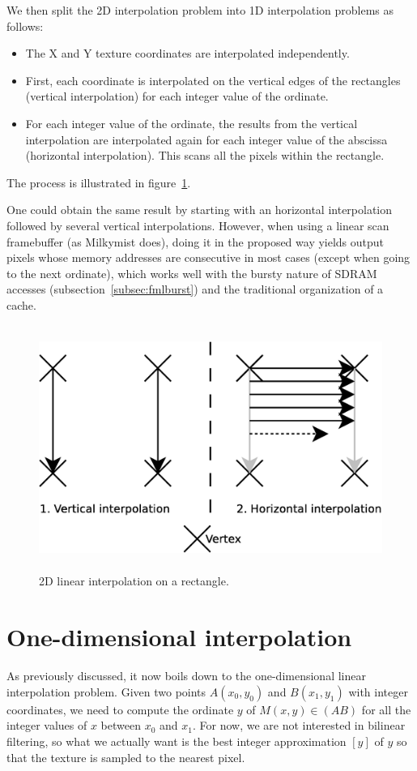 \documentclass[a4paper,11pt]{kthesis}
\begin{document}
We then split the 2D interpolation problem into 1D interpolation problems as follows:
\begin{itemize}
\item The X and Y texture coordinates are interpolated independently.
\item First, each coordinate is interpolated on the vertical edges of the rectangles (vertical interpolation) for each integer value of the ordinate.
\item For each integer value of the ordinate, the results from the vertical interpolation are interpolated again for each integer value of the abscissa (horizontal interpolation). This scans all the pixels within the rectangle.
\end{itemize}
The process is illustrated in figure~\ref{fig:rectinter}.

One could obtain the same result by starting with an horizontal interpolation followed by several vertical interpolations. However, when using a linear scan framebuffer (as Milkymist does), doing it in the proposed way yields output pixels whose memory addresses are consecutive in most cases (except when going to the next ordinate), which works well with the bursty nature of SDRAM accesses (subsection~\ref{subsec:fmlburst}) and the traditional organization of a cache.

\begin{figure}[htp]
\centering
\includegraphics[height=80mm]{rectinter.eps}
\caption{2D linear interpolation on a rectangle.}
\label{fig:rectinter}
\end{figure}

\section{One-dimensional interpolation}
As previously discussed, it now boils down to the one-dimensional linear interpolation problem. Given two points $A(x_{0}, y_{0})$ and $B(x_{1}, y_{1})$ with integer coordinates, we need to compute the ordinate $y$ of $M(x, y) \in (AB)$ for all the integer values of $x$ between $x_{0}$ and $x_{1}$. For now, we are not interested in bilinear filtering, so what we actually want is the best integer approximation $[y]$ of $y$ so that the texture is sampled to the nearest pixel.
\end{document}
